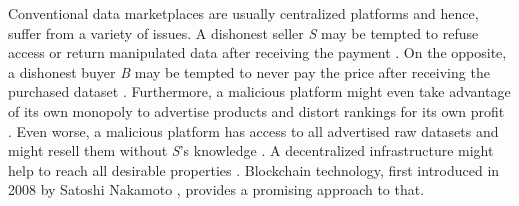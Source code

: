 
Conventional data marketplaces are usually centralized platforms and hence, suffer from a variety of issues. A dishonest seller \emph{S} may be tempted to refuse access or return manipulated data after receiving the payment \cite{suBDTFBlockchainBasedData2020,lawrenzBlockchainTechnologyApproach2019}. On the opposite, a dishonest buyer \emph{B} may be tempted to never pay the price after receiving the purchased dataset \cite{lawrenzBlockchainTechnologyApproach2019}. Furthermore, a malicious platform might even take advantage of its own monopoly to advertise products and distort rankings for its own profit \cite{ramachandranDecentralizedDataMarketplace2018}. Even worse, a malicious platform has access to all advertised raw datasets \cite{banerjeeBlockchainEnabledData2019} and might resell them without \emph{S}'s knowledge \cite{serranoPeertoPeerOwnershipPreservingData2021,suBDTFBlockchainBasedData2020,daiSDTESecureBlockchainBased2020}.
A decentralized infrastructure might help to reach all desirable properties \cite{ramachandranDecentralizedDataMarketplace2018}. Blockchain technology, first introduced in 2008 by Satoshi Nakamoto \cite{nakamotoBitcoinPeertoPeerElectronic}, provides a promising approach to that.


